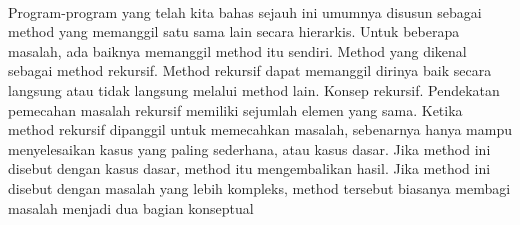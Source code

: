 \documentclass[a4paper,12pt]{article}
\begin{document}
\paragraph{}
Program-program yang telah kita bahas sejauh ini umumnya disusun sebagai method yang
memanggil satu sama lain secara hierarkis. Untuk beberapa masalah, ada baiknya memanggil
method itu sendiri. Method yang dikenal sebagai method rekursif. Method rekursif dapat
memanggil dirinya baik secara langsung atau tidak langsung melalui method lain. Konsep rekursif. Pendekatan pemecahan masalah rekursif memiliki sejumlah elemen yang sama. Ketika
method rekursif dipanggil untuk memecahkan masalah, sebenarnya hanya mampu
menyelesaikan kasus yang paling sederhana, atau kasus dasar. Jika method ini disebut dengan
kasus dasar, method itu mengembalikan hasil. Jika method ini disebut dengan masalah yang
lebih kompleks, method tersebut biasanya membagi masalah menjadi dua bagian konseptual
\end{document}
